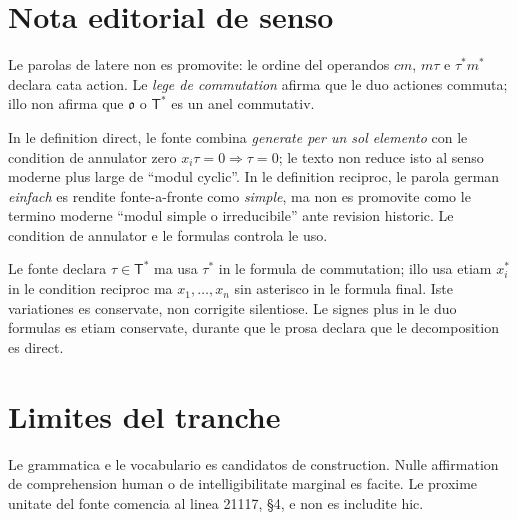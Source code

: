 \documentclass[11pt]{article}
\begin{document}
\clearpage
\vspace*{10mm}
\section*{Nota editorial de senso}

Le parolas de latere non es promovite: le ordine del operandos $cm$, $m\tau$ e $\tau^*m^*$ declara cata action. Le \emph{lege de commutation} afirma que le duo actiones commuta; illo non afirma que $\mathfrak{o}$ o $\mathsf T^*$ es un anel commutativ.

In le definition direct, le fonte combina \emph{generate per un sol elemento} con le condition de annulator zero $x_i\tau=0\Rightarrow\tau=0$; le texto non reduce isto al senso moderne plus large de ``modul cyclic''. In le definition reciproc, le parola german \emph{einfach} es rendite fonte-a-fronte como \emph{simple}, ma non es promovite como le termino moderne ``modul simple o irreducibile'' ante revision historic. Le condition de annulator e le formulas controla le uso.

Le fonte declara $\tau\in\mathsf T^*$ ma usa $\tau^*$ in le formula de commutation; illo usa etiam $x_i^*$ in le condition reciproc ma $x_1,\ldots,x_n$ sin asterisco in le formula final. Iste variationes es conservate, non corrigite silentiose. Le signes plus in le duo formulas es etiam conservate, durante que le prosa declara que le decomposition es direct.

\section*{Limites del tranche}

Le grammatica e le vocabulario es candidatos de construction. Nulle affirmation de comprehension human o de intelligibilitate marginal es facite. Le proxime unitate del fonte comencia al linea 21117, §4, e non es includite hic.
\end{document}
